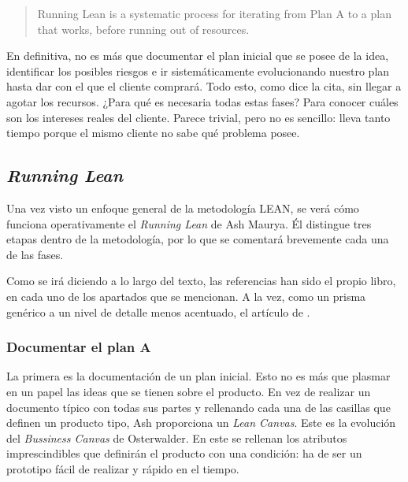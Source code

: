 \begin{quote}
	\small Running Lean is a systematic process for iterating from Plan A to a plan that works, before running out of resources.
	\begin{flushright}
	\end{flushright}
\end{quote}

En definitiva, no es más que documentar el plan inicial que se posee de la idea, identificar los posibles riesgos e ir sistemáticamente evolucionando nuestro plan hasta dar con el que el cliente comprará. Todo esto, como dice la cita, sin llegar a agotar los recursos. ¿Para qué es necesaria todas estas fases? Para conocer cuáles son los intereses reales del cliente. Parece trivial, pero no es sencillo: lleva tanto tiempo porque el mismo cliente no sabe qué problema posee.

\subsection{\textit{Running Lean}}

Una vez visto un enfoque general de la metodología LEAN, se verá cómo funciona operativamente el \textit{Running Lean} de Ash Maurya. Él distingue tres etapas dentro de la metodología, por lo que se comentará brevemente cada una de las fases.

Como se irá diciendo a lo largo del texto, las referencias han sido el propio libro, en cada uno de los apartados que se mencionan. A la vez, como un prisma genérico a un nivel de detalle menos acentuado, el artículo de .


\subsubsection{Documentar el plan A}

La primera es la documentación de un plan inicial. Esto no es más que plasmar en un papel las ideas que se tienen sobre el producto. En vez de realizar un documento típico con todas sus partes y rellenando cada una de las casillas que definen un producto tipo, Ash proporciona un \textit{Lean Canvas}. Este es la evolución del \textit{Bussiness Canvas} de Osterwalder. En este se rellenan los atributos imprescindibles que definirán el producto con una condición: ha de ser un prototipo fácil de realizar y rápido en el tiempo.

